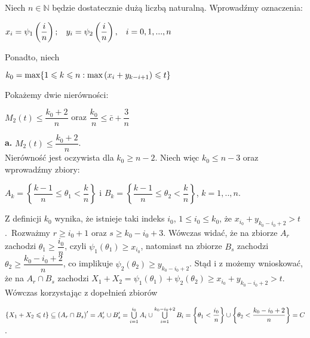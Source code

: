 \documentclass[12pt,a4paper,openany]{book}
\newcommand{\RomanNumeralCaps}[1]
    {\MakeUppercase{\romannumeral #1}}
\begin{document}
\noindent Niech $n \in \mathbb{N}$ będzie dostatecznie dużą liczbą naturalną. Wprowadźmy oznaczenia:
\begin{center}
$x_{i} = \psi_{1}\left( \dfrac{i}{n} \right) ; \hspace{3mm} y_{i} = \psi_{2}\left( \dfrac{i}{n} \right), \hspace{3mm}  i = 0,1,...,n$
\end{center}
Ponadto, niech
\begin{center}
$k_{0} = \textnormal{max}\lbrace 1 \leqslant k \leqslant n: \textnormal{max} \left( x_{i} + y_{k-i+1} \right) \leqslant t \rbrace$
\end{center}
Pokażemy dwie nierówności:
\begin{center}
$M_{2}(t) \leqslant \dfrac{k_{0}+2}{n}$ oraz $\dfrac{k_{0}}{n} \leqslant \bar c + \dfrac{3}{n}$
\end{center}
\noindent \textbf{\RomanNumeralCaps{2}a.} $M_{2}(t) \leqslant \dfrac{k_{0}+2}{n}$.\\
\noindent Nierówność jest oczywista dla $k_{0} \geqslant n-2$. Niech więc $k_{0} \leqslant n-3$ oraz wprowadźmy zbiory:
\begin{center}
$A_{k} = \left\lbrace \dfrac{k-1}{n} \leqslant \theta_{1} < \dfrac{k}{n} \right\rbrace$ i $B_{k} = \left\lbrace \dfrac{k-1}{n} \leqslant \theta_{2} < \dfrac{k}{n} \right\rbrace$, \hspace{3mm} $k=1,..,n.$
\end{center}
\noindent Z definicji $k_{0}$ wynika, że istnieje taki indeks $i_{0}$, $1 \leqslant i_{0} \leqslant k_{0}$, że $x_{i_{0}} + y_{k_{0}-i_{0}+2} > t$.\
\noindent Rozważmy $r \geqslant i_{0} + 1$ oraz $s \geqslant k_{0} - i_{0} +3$. Wówczas widać, że na zbiorze $A_{r}$ zachodzi $\theta_{1} \geqslant \dfrac{i_{0}}{n}$, czyli $\psi_{1}(\theta_{1}) \geqslant x_{i_{0}}$, natomiast na zbiorze $B_{s}$ zachodzi $\theta_{2} \geqslant \dfrac{k_{0} - i_{0} +2}{n}$,  co implikuje $\psi_{2}(\theta_{2}) \geqslant y_{k_{0} - i_{0} + 2}$. Stąd i z możemy wnioskować, że na $A_{r} \cap B_{s}$ zachodzi $X_{1} + X_{2} = \psi_{1}(\theta_{1}) + \psi_{2}(\theta_{2}) \geqslant x_{i_{0}} + y_{k_{0} - i_{0} +2} > t$. Wówczas korzystając z dopełnień zbiorów
\begin{center}
$\left\lbrace  X_{1} + X_{2} \leqslant t \right\rbrace \subseteq \left( A_{r} \cap B_{s} \right)' = A_{r}' \cup B_{s}' = \bigcup\limits_{i = 1}^{i_{0}} A_{i} \cup \bigcup\limits_{i = 1}^{k_{0} - i_{0} + 2} B_{i} \vspace{2mm} = \left\lbrace \theta_{1} < \dfrac{i_{0}}{n} \right\rbrace \cup \left\lbrace \theta_{2} < \dfrac{k_{0} - i_{0} + 2}{n} \right\rbrace = C$.
\end{center}
\end{document}
